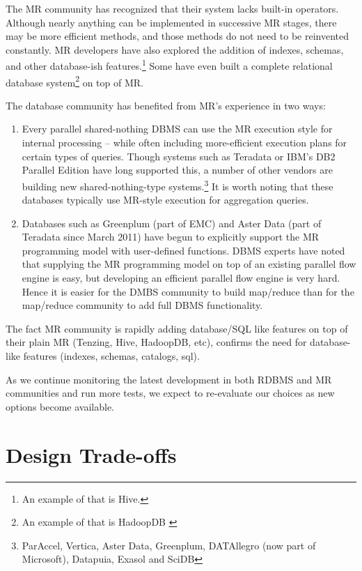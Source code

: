 \documentclass[DM,lsstdraft,toc]{lsstdoc}
\begin{document}
The MR community has recognized that their system lacks built-in
operators. Although nearly anything can be implemented in successive MR
stages, there may be more efficient methods, and those methods do not
need to be reinvented constantly. MR developers have also explored the
addition of indexes, schemas, and other database-ish features.\footnote{An
  example of that is Hive.}
Some have even built a complete relational database system\footnote{An
  example of that is
  HadoopDB \citep{HadoopDB}} on top
of MR.

The database community has benefited from MR's experience in two ways:

\begin{enumerate}
\def\labelenumi{\arabic{enumi}.}
\item
  Every parallel shared-nothing DBMS can use the MR execution style for
  internal processing -- while often including more-efficient execution
  plans for certain types of queries. Though systems such as Teradata or
  IBM's DB2 Parallel Edition have long supported this, a number of other
  vendors are building new shared-nothing-type systems.\footnote{ParAccel,
    Vertica, Aster Data, Greenplum, DATAllegro (now part of Microsoft),
    Datapuia, Exasol and SciDB} It is worth noting that these databases
  typically use MR-style execution for aggregation queries.
\item
  Databases such as Greenplum (part of EMC) and Aster Data (part of
  Teradata since March 2011) have begun to explicitly support the MR
  programming model with user-defined functions. DBMS experts have noted
  that supplying the MR programming model on top of an existing parallel
  flow engine is easy, but developing an efficient parallel flow engine
  is very hard. Hence it is easier for the DMBS community to build
  map/reduce than for the map/reduce community to add full DBMS
  functionality.
\end{enumerate}

The fact MR community is rapidly adding database/SQL like features on
top of their plain MR (Tenzing,
Hive, HadoopDB, etc),
confirms the need for database-like features (indexes, schemas,
catalogs, sql).

As we continue monitoring the latest development in both RDBMS and MR
communities and run more tests, we expect to re-evaluate our choices as
new options become available.

\section{Design Trade-offs}\label{design-trade-offs}
\end{document}
